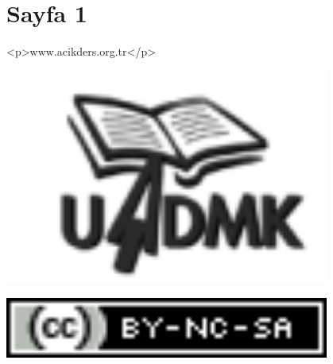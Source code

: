 \documentclass[12pt]{article}
\begin{document}
\section*{Sayfa 1}

<p>www.acikders.org.tr</p>

\includegraphics[width=0.8\textwidth]{output/PS4_page_1_img_0.png}

\includegraphics[width=0.8\textwidth]{output/PS4_page_1_img_1.png}

\newpage
\end{document}
